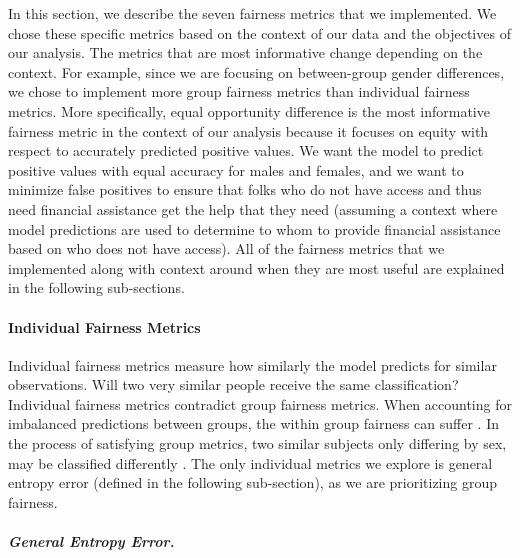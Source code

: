 \documentclass[water,article,submit,moreauthors,pdftex]{mdpi}
\begin{document}
In this section, we describe the seven fairness metrics that we
implemented. We chose these specific metrics based on the context of our
data and the objectives of our analysis. The metrics that are most
informative change depending on the context. For example, since we are
focusing on between-group gender differences, we chose to implement more
group fairness metrics than individual fairness metrics. More
specifically, equal opportunity difference is the most informative
fairness metric in the context of our analysis because it focuses on
equity with respect to accurately predicted positive values. We want the
model to predict positive values with equal accuracy for males and
females, and we want to minimize false positives to ensure that folks
who do not have access and thus need financial assistance get the help
that they need (assuming a context where model predictions are used to
determine to whom to provide financial assistance based on who does not
have access). All of the fairness metrics that we implemented along with
context around when they are most useful are explained in the following
sub-sections.

\hypertarget{individual-fairness-metrics}{%
\paragraph{Individual Fairness
Metrics}\label{individual-fairness-metrics}}

Individual fairness metrics measure how similarly the model predicts for
similar observations. Will two very similar people receive the same
classification? Individual fairness metrics contradict group fairness
metrics. When accounting for imbalanced predictions between groups, the
within group fairness can suffer \citep{kypraiou_what_2021}. In the
process of satisfying group metrics, two similar subjects only differing
by sex, may be classified differently
\citep{binns2020apparent, mehrabi2021survey, caton2020fairness, zhou2022bias}.
The only individual metrics we explore is general entropy error (defined
in the following sub-section), as we are prioritizing group fairness.

\hypertarget{general-entropy-error.}{%
\subparagraph{General Entropy Error.}\label{general-entropy-error.}}
\end{document}
